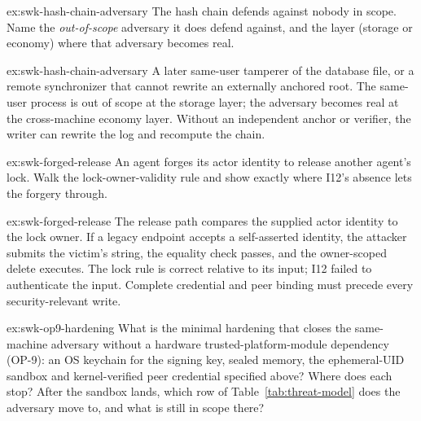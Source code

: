 \documentclass[11pt,a4paper]{article}
\theoremstyle{definition}
\theoremstyle{remark}
\begin{document}

\begin{pdexercise}[kind=Check,rating=1]{ex:swk-hash-chain-adversary}
The hash chain defends against nobody in scope. Name the \emph{out-of-scope} adversary it does defend against, and the layer (storage or economy) where that adversary becomes real.
\end{pdexercise}
\begin{pdsolution}{ex:swk-hash-chain-adversary}
A later same-user tamperer of the database file, or a remote synchronizer that cannot rewrite an externally anchored root. The same-user process is out of scope at the storage layer; the adversary becomes real at the cross-machine economy layer. Without an independent anchor or verifier, the writer can rewrite the log and recompute the chain.
\end{pdsolution}
\begin{pdexercise}[kind=Trace,rating=2]{ex:swk-forged-release}
An agent forges its actor identity to release another agent's lock. Walk the lock-owner-validity rule and show exactly where I12's absence lets the forgery through.
\end{pdexercise}
\begin{pdsolution}{ex:swk-forged-release}
The release path compares the supplied actor identity to the lock owner. If a legacy endpoint accepts a self-asserted identity, the attacker submits the victim's string, the equality check passes, and the owner-scoped delete executes. The lock rule is correct relative to its input; I12 failed to authenticate the input. Complete credential and peer binding must precede every security-relevant write.
\end{pdsolution}
\begin{pdexercise}[kind=Open,rating=3]{ex:swk-op9-hardening}
What is the minimal hardening that closes the same-machine adversary without a hardware trusted-platform-module dependency (OP-9): an OS keychain for the signing key, sealed memory, the ephemeral-UID sandbox and kernel-verified peer credential specified above? Where does each stop? After the sandbox lands, which row of Table~\ref{tab:threat-model} does the adversary move to, and what is still in scope there?
\end{pdexercise}
\end{document}
